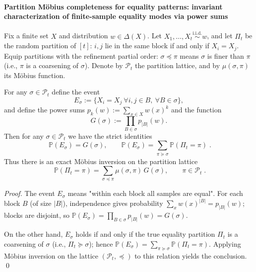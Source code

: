 \paragraph{Partition Möbius completeness for equality patterns: invariant characterization of finite-sample equality modes via power sums}
Fix a finite set \(X\) and distribution \(w\in\Delta(X)\).
Let \(X_1,\dots,X_t\stackrel{\mathrm{i.i.d.}}{\sim} w\), and let \(\Pi_t\) be the random partition of \([t]\): \(i,j\) lie in the same block if and only if \(X_i=X_j\).
Equip partitions with the refinement partial order: \(\sigma\preceq\pi\) means \(\sigma\) is finer than \(\pi\) (i.e., \(\pi\) is a coarsening of \(\sigma\)).
Denote by \(\mathcal{P}_t\) the partition lattice, and by \(\mu(\sigma,\pi)\) its Möbius function.
\begin{theorem}\label{thm:pom-partition-mobius-event-inversion}
For any \(\sigma\in\mathcal{P}_t\) define the event
\[
E_\sigma:=\{X_i=X_j\ \forall i,j\in B,\ \forall B\in\sigma\},
\]
and define the power sums
\(
p_k(w):=\sum_{x\in X}w(x)^k
\)
and the function
\[
G(\sigma):=\prod_{B\in\sigma}p_{|B|}(w).
\]
Then for any \(\sigma\in\mathcal{P}_t\) we have the strict identities
\[
\boxed{\;
\mathbb{P}(E_\sigma)=G(\sigma),\qquad
\mathbb{P}(E_\sigma)=\sum_{\pi\succeq\sigma}\mathbb{P}(\Pi_t=\pi)\; }.
\]
Thus there is an exact Möbius inversion on the partition lattice
\[
\boxed{\;
\mathbb{P}(\Pi_t=\pi)=\sum_{\sigma\preceq\pi}\mu(\sigma,\pi)\,G(\sigma),\qquad \pi\in\mathcal{P}_t\; }.
\]
\end{theorem}
\begin{proof}
The event \(E_\sigma\) means "within each block all samples are equal".
For each block \(B\) (of size \(|B|\)), independence gives probability \(\sum_{x}w(x)^{|B|}=p_{|B|}(w)\);
blocks are disjoint, so \(\mathbb{P}(E_\sigma)=\prod_{B\in\sigma}p_{|B|}(w)=G(\sigma)\).
\par
On the other hand, \(E_\sigma\) holds if and only if the true equality partition \(\Pi_t\) is a coarsening of \(\sigma\) (i.e., \(\Pi_t\succeq\sigma\));
hence \(\mathbb{P}(E_\sigma)=\sum_{\pi\succeq\sigma}\mathbb{P}(\Pi_t=\pi)\).
Applying Möbius inversion on the lattice \((\mathcal{P}_t,\preceq)\) to this relation yields the conclusion. \qed
\end{proof}

